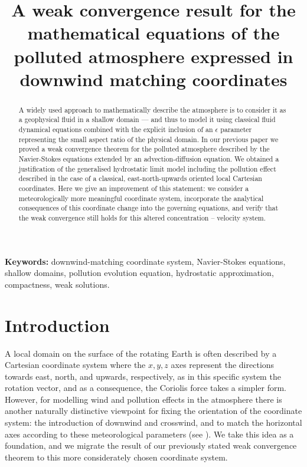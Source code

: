 \documentclass[11pt]{article}
\title{A weak convergence result for the mathematical equations of the polluted atmosphere expressed in downwind matching coordinates}
\date{}
\begin{document}
\maketitle

\begin{abstract}

A widely used approach to mathematically describe the atmosphere is to consider it as a geophysical fluid in a shallow domain --- and thus to model it using classical fluid dynamical equations combined with the explicit inclusion of an $\epsilon$ parameter representing the small aspect ratio of the physical domain. In our previous paper we proved a weak convergence theorem for the polluted atmosphere described by the Navier-Stokes equations extended by an advection-diffusion equation. We obtained a justification of the generalised hydrostatic limit model including the pollution effect described in the case of a classical, east-north-upwards oriented local Cartesian coordinates. Here we give an improvement of this statement: we consider a meteorologically more meaningful coordinate system, incorporate the analytical consequences of this coordinate change into the governing equations, and verify that the weak convergence still holds for this altered concentration -- velocity system.

\end{abstract}

{\bf Keywords:} downwind-matching coordinate system, Navier-Stokes equations, shallow domains, pollution evolution equation, hydrostatic approximation, compactness, weak solutions.

\newpage

\tableofcontents
\newpage

\section{Introduction} \label{Introduction}

A local domain on the surface of the rotating Earth is often described by a Cartesian coordinate system where the $x, y, z$ axes represent the directions towards east, north, and upwards, respectively, as in this specific system the rotation vector, and as a consequence, the Coriolis force takes a simpler form. However, for modelling wind and pollution effects in the atmosphere there is another naturally distinctive viewpoint for fixing the orientation of the coordinate system: the introduction of downwind and crosswind, and to match the horizontal axes according to these meteorological parameters (see \cite{goyal2011mathematical}). We take this idea as a foundation, and we migrate the result of our previously stated weak convergence theorem to this more considerately chosen coordinate system.
\end{document}
